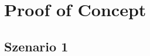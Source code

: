 \chapter{Proof of Concept}

\section{Szenario 1}\label{poc:scenario1}
\begin{comment}
\begin{figure}[htb]
    \begin{subfigure}[b]{0.5\columnwidth}
      \texttt{[image: fig/render\_läuferverband50.png]}
      \caption{Bla.}
      \label{fig:poc:render_läuferverband50}
    \end{subfigure}
    \hfill
    \begin{subfigure}[b]{0.5\columnwidth}
      \texttt{[image: fig/render\_crossbond.png]}
      \caption{Bla.}
      \label{fig:poc:render_crossbond}
    \end{subfigure}
    \begin{subfigure}[b]{0.5\columnwidth}
      \texttt{[image: fig/render\_headbond.png]}
      \caption{Bla.}
      \label{fig:poc:render_headbond}
    \end{subfigure}
    \caption{Ergebnisse.}
    \label{fig:poc:result_scenario1}
  \end{figure}
\end{comment}